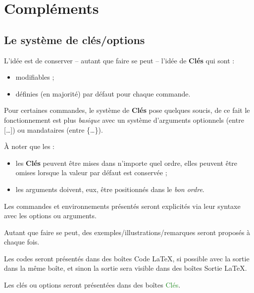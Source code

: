 \documentclass{article}
\newcommand\Cle[1]{{\bfseries\sffamily\textlangle #1\textrangle}}
\begin{document}
\section{Compléments}

\subsection{Le système de \og clés/options \fg}

\begin{codeidee}
L'idée est de conserver -- autant que faire se peut -- l'idée de \Cle{Clés} qui sont :
%
\begin{itemize}
	\item modifiables ;
	\item définies (en majorité) par défaut pour chaque commande.
\end{itemize}

Pour certaines commandes, le système de \Cle{Clés} pose quelques soucis, de ce fait le fonctionnement est plus \textit{basique} avec un système d'\textsf{arguments} optionnels (entre \textsf{[\ldots]}) ou mandataires (entre \textsf{\{\ldots\}}).

\smallskip

À noter que les :
%
\begin{itemize}
	\item les \Cle{Clés} peuvent être mises dans n'importe quel ordre, elles peuvent être omises lorsque la valeur par défaut est conservée ;
	\item les \textsf{arguments} doivent, eux, être positionnés dans le \textit{bon ordre}.
\end{itemize}
\end{codeidee}

\begin{codeinfo}
Les \textsf{commandes} et \textsf{environnements} présentés seront explicités via leur \textsf{syntaxe} avec les \textsf{options} ou \textsf{arguments}.

Autant que faire se peut, des exemples/illustrations/remarques seront proposés à chaque fois.

\smallskip

Les \textsf{codes} seront présentés dans des \textsf{boîtes} \textcolor{red!75!black}{{\small \faCode} Code \LaTeX}, si possible avec la \textsf{sortie} dans la même boîte, et sinon la \textsf{sortie} sera visible dans des \textsf{boîtes} \textcolor{red!75!black}{{\small \faArrowAltCircleRight[regular]} Sortie \LaTeX}.

Les \textsf{clés} ou \textsf{options} seront présentées dans des \textsf{boîtes} \textcolor{ForestGreen}{{\small \faPaperclip} Clés}.
\end{codeinfo}
\end{document}
